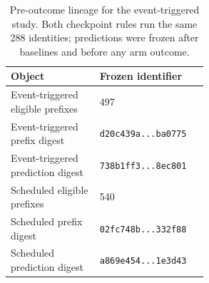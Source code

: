 \begin{table}[ht]
\caption{Pre-outcome lineage for the event-triggered study. Both checkpoint rules run the same 288 identities; predictions were frozen after baselines and before any arm outcome.}
\label{tab:r2-lineage}
\centering
\small
\begin{tabular}{@{}lp{0.55\linewidth}@{}}
\toprule
Object & Frozen identifier \\
\midrule
Event-triggered eligible prefixes & 497 \\
Event-triggered prefix digest & \texttt{d20c439a...ba0775} \\
Event-triggered prediction digest & \texttt{738b1ff3...8ec801} \\
Scheduled eligible prefixes & 540 \\
Scheduled prefix digest & \texttt{02fc748b...332f88} \\
Scheduled prediction digest & \texttt{a869e454...1e3d43} \\
\bottomrule
\end{tabular}
\end{table}
